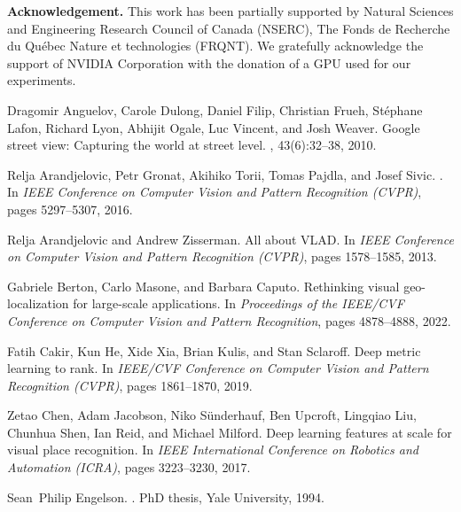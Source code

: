 \documentclass{article}
\begin{document}
\vspace{10pt}
\noindent\textbf{Acknowledgement.} This work has been partially supported by Natural Sciences and Engineering Research Council of Canada (NSERC), The Fonds de Recherche du Québec Nature et technologies (FRQNT). We gratefully acknowledge the support of NVIDIA Corporation with the donation of a GPU used for our experiments.



\begin{thebibliography}{99}
Dragomir Anguelov, Carole Dulong, Daniel Filip, Christian Frueh, Stéphane
  Lafon, Richard Lyon, Abhijit Ogale, Luc Vincent, and Josh Weaver.
\newblock Google street view: Capturing the world at street level.
, 43(6):32--38, 2010.

Relja Arandjelovic, Petr Gronat, Akihiko Torii, Tomas Pajdla, and Josef Sivic.
.
\newblock In {\em IEEE Conference on Computer Vision and Pattern Recognition
  (CVPR)}, pages 5297--5307, 2016.

Relja Arandjelovic and Andrew Zisserman.
\newblock All about {VLAD}.
\newblock In {\em IEEE Conference on Computer Vision and Pattern Recognition
  (CVPR)}, pages 1578--1585, 2013.

Gabriele Berton, Carlo Masone, and Barbara Caputo.
\newblock Rethinking visual geo-localization for large-scale applications.
\newblock In {\em Proceedings of the IEEE/CVF Conference on Computer Vision and
  Pattern Recognition}, pages 4878--4888, 2022.

Fatih Cakir, Kun He, Xide Xia, Brian Kulis, and Stan Sclaroff.
\newblock Deep metric learning to rank.
\newblock In {\em IEEE/CVF Conference on Computer Vision and Pattern
  Recognition (CVPR)}, pages 1861--1870, 2019.

Zetao Chen, Adam Jacobson, Niko S{\"u}nderhauf, Ben Upcroft, Lingqiao Liu,
  Chunhua Shen, Ian Reid, and Michael Milford.
\newblock Deep learning features at scale for visual place recognition.
\newblock In {\em IEEE International Conference on Robotics and Automation
  (ICRA)}, pages 3223--3230, 2017.

Sean~Philip Engelson.
.
\newblock PhD thesis, Yale University, 1994.


\end{thebibliography}
\end{document}
